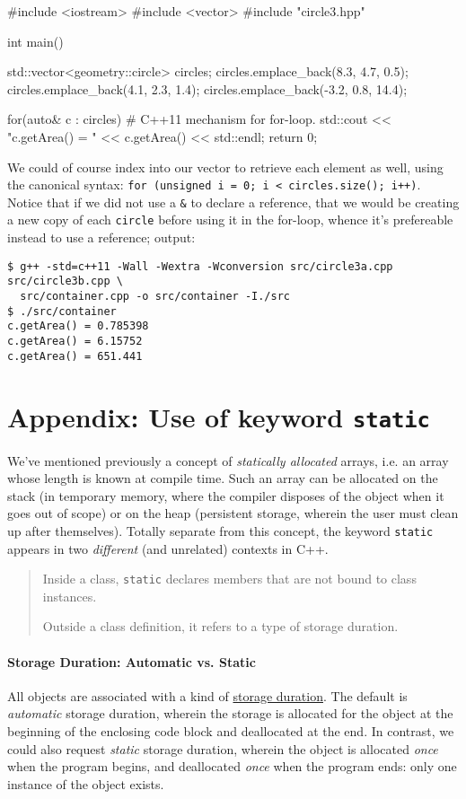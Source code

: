 \documentclass[12pt,letterpaper,twoside]{article}
\begin{document}
\begin{cpp}
#include <iostream>
#include <vector>
#include "circle3.hpp"

int main() {
  std::vector<geometry::circle> circles;
  circles.emplace_back(8.3, 4.7, 0.5);
  circles.emplace_back(4.1, 2.3, 1.4);
  circles.emplace_back(-3.2, 0.8, 14.4);

  for(auto& c : circles)   # C++11 mechanism for for-loop.
    std::cout << "c.getArea() = " << c.getArea() << std::endl;
  return 0;
}
\end{cpp}

We could of course index into our vector to retrieve each element as well,
using the canonical syntax: 
\texttt{for (unsigned i = 0; i < circles.size(); i++)}. Notice that if we did
not use a \texttt{\&} to declare a reference, that we would be creating a new
copy of each \texttt{circle} before using it in the for-loop, whence it's 
prefereable instead to use a reference;
output:

\begin{verbatim}
$ g++ -std=c++11 -Wall -Wextra -Wconversion src/circle3a.cpp src/circle3b.cpp \ 
  src/container.cpp -o src/container -I./src
$ ./src/container 
c.getArea() = 0.785398
c.getArea() = 6.15752
c.getArea() = 651.441
\end{verbatim}

\section{Appendix: Use of keyword \texttt{static}} We've mentioned 
previously a concept
of \emph{statically allocated} arrays, i.e. an array whose length is known at 
compile time. Such an array can be allocated on the stack 
(in temporary memory, where the compiler disposes of the object when 
it goes out of scope) 
or on the heap (persistent storage, wherein the user must clean up after 
themselves). Totally separate from this concept, the keyword \texttt{static} 
appears in two \emph{different} (and unrelated) contexts in C++.

\begin{quotation}   Inside a class, \texttt{static} declares members that are 
  not bound to class instances.

  Outside a class definition, it refers to a type of storage duration. \end{quotation}

\paragraph{Storage Duration: Automatic vs. Static} 
All objects are associated with a kind of 
\href{https://en.cppreference.com/w/cpp/language/storage_duration}
{storage duration}. The default is \emph{automatic} storage duration, wherein the storage is allocated for the object at the beginning of the enclosing code block and deallocated at the end. In contrast, we could also request \emph{static} storage duration, wherein the object is allocated \emph{once} when the program begins, and deallocated \emph{once} when the program ends: only one instance of the object exists.
\end{document}
